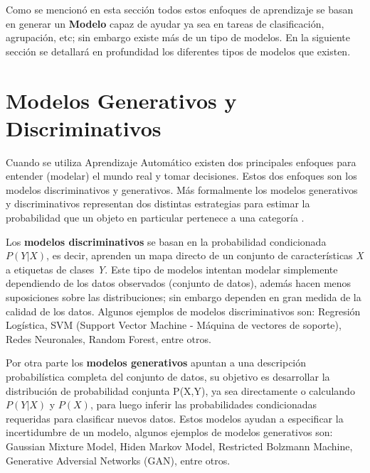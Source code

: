 \vspace{5mm} %

Como se mencion\'{o} en esta secci\'{o}n todos estos enfoques de aprendizaje se basan en generar un \textbf{Modelo} capaz de ayudar ya sea en tareas de clasificaci\'{o}n, agrupaci\'{o}n, etc; sin embargo existe m\'{a}s de un tipo de modelos. En la siguiente secci\'{o}n se detallar\'{a} en profundidad los diferentes tipos de modelos que existen.


\section{Modelos Generativos y Discriminativos}

Cuando se utiliza Aprendizaje Autom\'{a}tico existen dos principales enfoques para entender (modelar) el mundo real y tomar decisiones. Estos dos enfoques son los modelos discriminativos y generativos. M\'{a}s formalmente los modelos generativos y discriminativos representan dos distintas estrategias para estimar la probabilidad que un objeto en particular pertenece a una categor\'{i}a \cite{Reference42}.


\vspace{5mm} %

Los \textbf{modelos discriminativos} se basan en la probabilidad condicionada $P(Y|X)$, es decir, aprenden un mapa directo de un conjunto de caracter\'{i}sticas \textit{X} a etiquetas de clases \textit{Y}. Este tipo de modelos intentan modelar simplemente dependiendo de los datos observados (conjunto de datos), adem\'{a}s hacen menos suposiciones sobre las distribuciones; sin embargo dependen en gran medida de la calidad de los datos. Algunos ejemplos de modelos discriminativos son: Regresi\'{o}n Log\'{i}stica, SVM (Support Vector Machine - M\'{a}quina de vectores de soporte), Redes Neuronales, Random Forest, entre otros.

\vspace{5mm} %

Por otra parte los \textbf{modelos generativos} apuntan a una descripci\'{o}n probabil\'{i}stica completa del conjunto de datos, su objetivo es desarrollar la distribuci\'{o}n de probabilidad conjunta P(X,Y), ya sea directamente o calculando $P(Y|X)$ y $P(X)$, para luego inferir las probabilidades condicionadas requeridas para clasificar nuevos datos. Estos modelos ayudan a especificar la incertidumbre de un modelo, algunos ejemplos de modelos generativos son: Gaussian Mixture Model, Hiden Markov Model, Restricted Bolzmann Machine, Generative Adversial Networks (GAN), entre otros.

